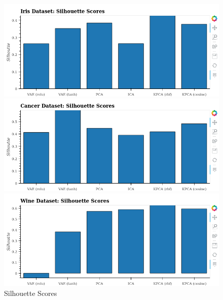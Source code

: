 \documentclass[12pt]{article}
\begin{document}
\begin{figure}[!htb]
         \centering
         \includegraphics[scale=0.5]{../../media/02-iris-silhouette.png}
       
         \label{fig:benchiriss}
     
         \includegraphics[scale=0.5]{../../media/02-cancer-silhouette.png}
     
         \label{fig:benchcancers}
     
         \includegraphics[scale=0.5]{../../media/02-wine-silhouette.png}

         \label{fig:benchwines}
        \caption{Silhouette Scores}
        \label{fig:clustering}
\end{figure}


\newpage
\end{document}
